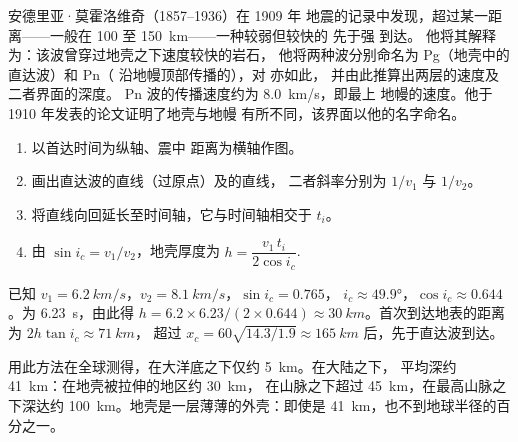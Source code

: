 \begin{history}[莫霍洛维奇与两种 P 波，1909 年]
安德里亚·莫霍洛维奇（1857--1936）在 1909 年
地震的记录中发现，超过某一距离——一般在 100 至
\qty{150}{km}——一种较弱但较快的 先于强 到达。
他将其解释为：该波曾穿过地壳之下速度较快的岩石，
他将两种波分别命名为 Pg（地壳中的直达波）和 Pn（
沿地幔顶部传播的），对 亦如此，
并由此推算出两层的速度及二者界面的深度。
Pn 波的传播速度约为 \qty{8.0}{km/s}，即最上
地幔的速度。他于 1910 年发表的论文证明了地壳与地幔
有所不同，该界面以他的名字命名。
\end{history}

\begin{method}[由走时图确定莫霍面的深度]\label{met:g11:seismic-structure:moho}
\begin{enumerate}
  \item 以首达时间为纵轴、震中
        距离为横轴作图。
  \item 画出直达波的直线（过原点）及的直线，
        二者斜率分别为 $1/v_1$ 与 $1/v_2$。
  \item 将直线向回延长至时间轴，它与时间轴相交于
         $t_i$。
  \item 由 $\sin i_c = v_1/v_2$，地壳厚度为
        $h = \dfrac{v_1\,t_i}{2\cos i_c}$.
\end{enumerate}
\end{method}

\begin{example}\label{ex:g11:seismic-structure:moho}
已知 $v_1 = \qty{6.2}{km/s}$，$v_2 = \qty{8.1}{km/s}$，$\sin i_c = 0.765$，
$i_c \approx \ang{49.9}$，$\cos i_c \approx 0.644$。为
\qty{6.23}{s}，由此得 $h = 6.2 \times 6.23/(2 \times 0.644) \approx
\qty{30}{km}$。首次到达地表的距离为
$2h\tan i_c \approx \qty{71}{km}$，
超过 $x_c = 60\sqrt{14.3/1.9} \approx \qty{165}{km}$ 后，先于直达波到达。
\end{example}

用此方法在全球测得，在大洋底之下仅约
\qty{5}{km}。在大陆之下，
平均深约 \qty{41}{km}：在地壳被拉伸的地区约 \qty{30}{km}，
在山脉之下超过 \qty{45}{km}，在最高山脉之下深达约
\qty{100}{km}。地壳是一层薄薄的外壳：即使是
\qty{41}{km}，也不到地球半径的百分之一。

